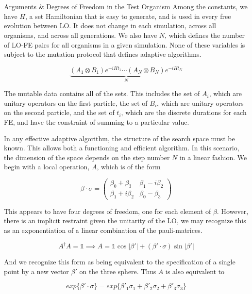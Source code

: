 \documentclass[12pt]{beamer}
\renewcommand{\maketitle}{%
	\begin{center}%
		\Huge\inserttitle\\[5mm]%
		\Large\insertauthor\\[5mm]%
		\Large\insertinstitute%
	\end{center}%
	\vspace*{-1ex}%
}
\begin{document}
\begin{frame}{\maketitle}
\begin{columns}
\begin{column}{.45\textwidth}
\begin{exampleblock}{Arguments \& Degrees of Freedom in the Test Organism}
	Among the constants, we have $H$, a set Hamiltonian that is easy to generate, and is used in every free evolution between LO. It does not change in each simulation, across all organisms, and across all generations. We also have $N$, which defines the number of LO-FE pairs for all organisms in a given simulation. None of these variables is subject to the mutation protocol that defines adaptive algorithms. 

	\begin{equation}
		\underbrace{  (A_1\otimes B_1)e^{-i H t_1}\cdots(A_{N}\otimes B_{N})e^{-i H t_{N}}}_{N}
	\end{equation}

	The mutable data contains all of the sets. This includes the set of $A_i$, which are unitary operators on the first particle, the set of $B_i$, which are unitary operators on the second particle, and the set of $t_i$, which are the discrete durations for each FE, and have the constraint of summing to a particular value.
	
	In any effective adaptive algorithm, the structure of the search space must be known. This allows both a functioning and efficient algorithm. In this scenario, the dimension of the space depends on the step number $N$ in a linear fashion. We begin with a local operation, $A$, which is of the form

	\begin{equation}
		\beta \cdot \sigma 
		= 
		\begin{pmatrix}
			\beta_0 + \beta_3    &    \beta_1 - i \beta_2\\[3mm]
			\beta_1 + i \beta_2  &    \beta_0 - \beta_3
		\end{pmatrix}
	\end{equation}

	This appears to have four degrees of freedom, one for each element of $\beta$. However, there is an implicit restraint given the unitarity of the LO, we may recognize this as an exponentiation of a linear combination of the pauli-matrices. 

	\begin{equation}
		A^{\dagger}A = \mathds{1} \implies A = \mathds{1}\cos{|\beta'|} + (\beta' \cdot \sigma) \sin{|\beta'|}
	\end{equation}

	And we recognize this form as being equivalent to the specification of a single point by a new vector $\beta'$ on the three sphere. Thus $A$ is also equivalent to 

	\begin{equation}
		exp\{\beta' \cdot \sigma\} = exp\{\beta'_1 \sigma_1 + \beta'_2 \sigma_2 + \beta'_3 \sigma_3 \}
	\end{equation}


\end{exampleblock}
\end{column}
\end{columns}
\end{frame}
\end{document}
